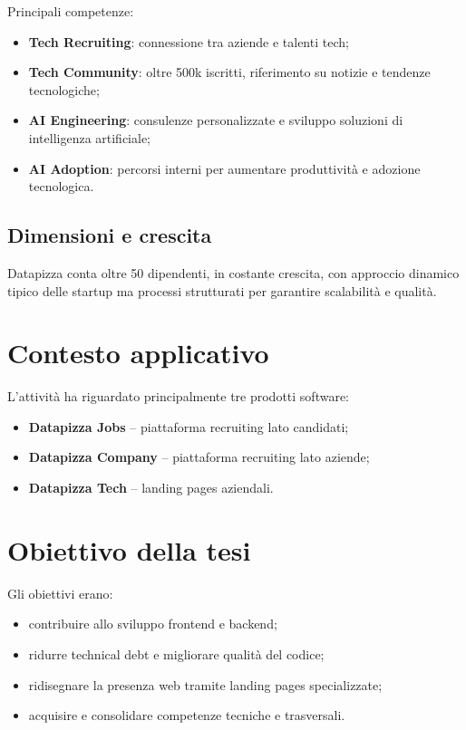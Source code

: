 \documentclass[12pt,a4paper,openright,twoside]{book}
\begin{document}
Principali competenze:
\begin{itemize}
  \item \textbf{Tech Recruiting}: connessione tra aziende e talenti tech;
  \item \textbf{Tech Community}: oltre 500k iscritti, riferimento su notizie e tendenze tecnologiche;
  \item \textbf{AI Engineering}: consulenze personalizzate e sviluppo soluzioni di intelligenza artificiale;
  \item \textbf{AI Adoption}: percorsi interni per aumentare produttività e adozione tecnologica.
\end{itemize}

\section{Dimensioni e crescita}
Datapizza conta oltre 50 dipendenti, in costante crescita, con approccio dinamico tipico delle startup ma processi strutturati per garantire scalabilità e qualità.

\chapter{Contesto applicativo}
L’attività ha riguardato principalmente tre prodotti software:
\begin{itemize}
  \item \textbf{Datapizza Jobs} – piattaforma recruiting lato candidati;
  \item \textbf{Datapizza Company} – piattaforma recruiting lato aziende;
  \item \textbf{Datapizza Tech} – landing pages aziendali.
\end{itemize}

\chapter{Obiettivo della tesi}
Gli obiettivi erano:
\begin{itemize}
  \item contribuire allo sviluppo frontend e backend;
  \item ridurre technical debt e migliorare qualità del codice;
  \item ridisegnare la presenza web tramite landing pages specializzate;
  \item acquisire e consolidare competenze tecniche e trasversali.
\end{itemize}
\end{document}
